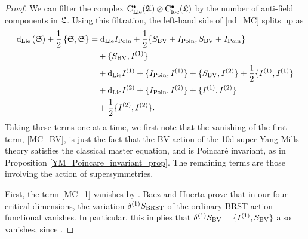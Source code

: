 \documentclass[10pt, oneside]{article}
\begin{document}
\begin{proof}
We can filter the complex ${\rm C}_{\rm Lie}^\bullet(\mathfrak{A}) \otimes {\rm C}_{\rm loc}^\bullet(\mathfrak L)$ by the number of anti-field components in $\mathfrak L$.  Using this filtration, the left-hand side of \ref{nd_MC} splits up as
\begin{align}
{\rm d}_{\rm Lie}  \left( \mathfrak S \right) + \frac{1}{2} \left\{ \mathfrak S , \mathfrak S \right\} &= {\rm d}_{\mathrm{Lie}} I_{\mathrm{Poin}} + \frac 12 \{S_{\mathrm{BV}} + I_{\mathrm{Poin}}, S_{\mathrm{BV}} + I_{\mathrm{Poin}}\} \label{MC_BV}\\
&\quad + \{S_{\mathrm{BV}}, I^{(1)}\} \label{MC_1}\\
&\quad + {\rm d}_{\mathrm{Lie}} I^{(1)} + \{I_{\mathrm{Poin}}, I^{(1)}\} + \{S_{\mathrm{BV}}, I^{(2)}\} + \frac 12 \{I^{(1)}, I^{(1)}\} \label{MC_2}\\
&\quad + {\rm d}_{\mathrm{Lie}} I^{(2)} + \{I_{\mathrm{Poin}}, I^{(2)}\} + \{I^{(1)}, I^{(2)}\} \label{MC_3}\\
&\quad + \frac 12 \{I^{(2)}, I^{(2)}\}. \label{MC_4}
\end{align}
Taking these terms one at a time, we first note that the vanishing of the first term, \ref{MC_BV}, is just the fact that the BV action of the 10d super Yang-Mills theory satisfies the classical master equation, and is Poincar\'e invariant, as in Proposition \ref{YM_Poincare_invariant_prop}. The remaining terms are those involving the action of supersymmetries.

First, the term \ref{MC_1} vanishes by \cite[Proposition 14]{BaezHuerta}.  Baez and Huerta prove that in our four critical dimensions, the variation $\delta^{(1)}S_{\mathrm{BRST}}$ of the ordinary BRST action functional vanishes.  In particular, this implies that $\delta^{(1)}S_{\mathrm{BV}} = \{I^{(1)}, S_{\mathrm{BV}}\}$ also vanishes, since .


\end{proof}
\end{document}
